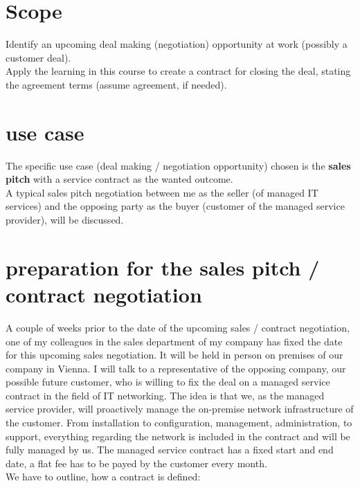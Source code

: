 \chapter{Scope}

Identify an upcoming deal making (negotiation) opportunity at work (possibly a customer deal). \\

\noindent Apply the learning in this course to create a contract for closing the deal, stating the agreement terms (assume agreement, if needed).

\chapter{use case}

The specific use case (deal making / negotiation opportunity) chosen is the \textbf{sales pitch}
with a service contract as the wanted outcome. \\

\noindent A typical sales pitch negotiation between me as the seller (of managed IT services) and 
the opposing party as the buyer (customer of the managed service provider), will be discussed. \\
 
\chapter{preparation for the sales pitch / contract negotiation}

A couple of weeks prior to the date of the upcoming sales / contract negotiation,
one of my colleagues in the sales department of my company has fixed the date
for this upcoming sales negotiation. It will be held in person on premises of
our company in Vienna. I will talk to a representative of the opposing company,
our possible future customer, who is willing to fix the deal on a 
managed service contract in the field of IT networking. The idea is that
we, as the managed service provider, will proactively manage the on-premise
network infrastructure of the customer. From installation to configuration,
management, administration, to support, everything regarding the network
is included in the contract and will be fully managed by us. 
The managed service contract has a fixed start and end date, a flat fee has to be payed by the customer
every month. \\

\noindent We have to outline, how a contract is defined:

